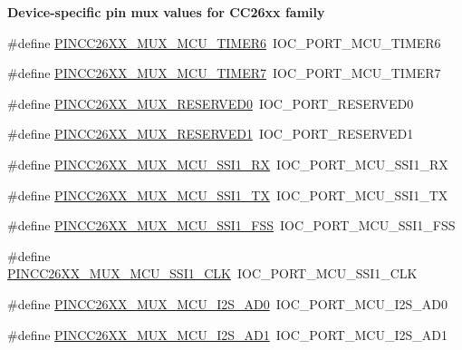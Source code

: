 \begin{Indent}{\bf Device-\/specific pin mux values for C\+C26xx family}
\begin{DoxyCompactItemize}
\item 
\#define \hyperlink{_p_i_n_c_c26_x_x_8h_a919f7a43fa29974e94f356c3ef0cb3a2}{P\+I\+N\+C\+C26\+X\+X\+\_\+\+M\+U\+X\+\_\+\+M\+C\+U\+\_\+\+T\+I\+M\+E\+R6}~I\+O\+C\+\_\+\+P\+O\+R\+T\+\_\+\+M\+C\+U\+\_\+\+T\+I\+M\+E\+R6
\item 
\#define \hyperlink{_p_i_n_c_c26_x_x_8h_a5cd4fd779c61244915aef4d6d436866b}{P\+I\+N\+C\+C26\+X\+X\+\_\+\+M\+U\+X\+\_\+\+M\+C\+U\+\_\+\+T\+I\+M\+E\+R7}~I\+O\+C\+\_\+\+P\+O\+R\+T\+\_\+\+M\+C\+U\+\_\+\+T\+I\+M\+E\+R7
\item 
\#define \hyperlink{_p_i_n_c_c26_x_x_8h_af96d092f498cb7a2550b17d9dc20c9bd}{P\+I\+N\+C\+C26\+X\+X\+\_\+\+M\+U\+X\+\_\+\+R\+E\+S\+E\+R\+V\+E\+D0}~I\+O\+C\+\_\+\+P\+O\+R\+T\+\_\+\+R\+E\+S\+E\+R\+V\+E\+D0
\item 
\#define \hyperlink{_p_i_n_c_c26_x_x_8h_ad0b60558170f22cce2aa6b5a9021fb60}{P\+I\+N\+C\+C26\+X\+X\+\_\+\+M\+U\+X\+\_\+\+R\+E\+S\+E\+R\+V\+E\+D1}~I\+O\+C\+\_\+\+P\+O\+R\+T\+\_\+\+R\+E\+S\+E\+R\+V\+E\+D1
\item 
\#define \hyperlink{_p_i_n_c_c26_x_x_8h_ac3d873c9fc963e7abdd88ac92a2efb97}{P\+I\+N\+C\+C26\+X\+X\+\_\+\+M\+U\+X\+\_\+\+M\+C\+U\+\_\+\+S\+S\+I1\+\_\+\+R\+X}~I\+O\+C\+\_\+\+P\+O\+R\+T\+\_\+\+M\+C\+U\+\_\+\+S\+S\+I1\+\_\+\+R\+X
\item 
\#define \hyperlink{_p_i_n_c_c26_x_x_8h_a6843ba0b056b1b2a7ee3b6471da4e6a1}{P\+I\+N\+C\+C26\+X\+X\+\_\+\+M\+U\+X\+\_\+\+M\+C\+U\+\_\+\+S\+S\+I1\+\_\+\+T\+X}~I\+O\+C\+\_\+\+P\+O\+R\+T\+\_\+\+M\+C\+U\+\_\+\+S\+S\+I1\+\_\+\+T\+X
\item 
\#define \hyperlink{_p_i_n_c_c26_x_x_8h_aef46bbee91ef9b7786e7ff242ebc9383}{P\+I\+N\+C\+C26\+X\+X\+\_\+\+M\+U\+X\+\_\+\+M\+C\+U\+\_\+\+S\+S\+I1\+\_\+\+F\+S\+S}~I\+O\+C\+\_\+\+P\+O\+R\+T\+\_\+\+M\+C\+U\+\_\+\+S\+S\+I1\+\_\+\+F\+S\+S
\item 
\#define \hyperlink{_p_i_n_c_c26_x_x_8h_a9625d595a8b69fa6e5405741818e1bda}{P\+I\+N\+C\+C26\+X\+X\+\_\+\+M\+U\+X\+\_\+\+M\+C\+U\+\_\+\+S\+S\+I1\+\_\+\+C\+L\+K}~I\+O\+C\+\_\+\+P\+O\+R\+T\+\_\+\+M\+C\+U\+\_\+\+S\+S\+I1\+\_\+\+C\+L\+K
\item 
\#define \hyperlink{_p_i_n_c_c26_x_x_8h_ab4fda137377a46f157d7d1ec55339dc7}{P\+I\+N\+C\+C26\+X\+X\+\_\+\+M\+U\+X\+\_\+\+M\+C\+U\+\_\+\+I2\+S\+\_\+\+A\+D0}~I\+O\+C\+\_\+\+P\+O\+R\+T\+\_\+\+M\+C\+U\+\_\+\+I2\+S\+\_\+\+A\+D0
\item 
\#define \hyperlink{_p_i_n_c_c26_x_x_8h_a3d04198ab5bfdd7a50d113833bf64bc9}{P\+I\+N\+C\+C26\+X\+X\+\_\+\+M\+U\+X\+\_\+\+M\+C\+U\+\_\+\+I2\+S\+\_\+\+A\+D1}~I\+O\+C\+\_\+\+P\+O\+R\+T\+\_\+\+M\+C\+U\+\_\+\+I2\+S\+\_\+\+A\+D1

\end{DoxyCompactItemize}
\end{Indent}
